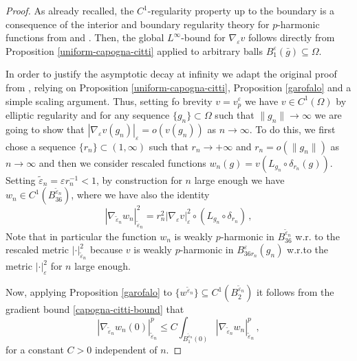 \documentclass[10pt]{amsart}
\numberwithin{equation}{section}
\theoremstyle{definition}
\begin{document}
\begin{proof}

As already recalled, the $C^1$-regularity property up to the boundary is a consequence of the interior and boundary regularity theory for $p$-harmonic functions from \cite{Dibenedetto} and \cite{Lieberman}. Then, the global $L^\infty$-bound for $\nabla_\varepsilon v$ follows directly from Proposition \ref{uniform-capogna-citti} applied to arbitrary balls $B_1^\varepsilon(\bar{g})\subseteq \Omega$. 

In order to justify the asymptotic decay at infinity we adapt the original proof from \cite{Moser}, relying on Proposition \ref{uniform-capogna-citti}, Proposition \ref{garofalo} and a simple scaling argument. Thus, setting fo brevity $v=v^\varepsilon_p$ we have $v \in C^1(\Omega)$ by elliptic regularity and for any sequence $\{g_n\} \subset \Omega$ such that $\|g_n\| \to \infty$ we are going to show that $|\nabla_\varepsilon v (g_n) |_\varepsilon =o(v(g_n))$ as $n \to \infty$. To do this, we first chose a sequence $\{r_n\} \subset (1,\infty)$ such that $r_n \to +\infty$ and $r_n=o(\|g_n\|)$ as $n \to \infty$ and then we consider rescaled functions 
$w_n(g)=v(L_{g_n}\circ \delta_{r_n}(g))$. 
Setting $\tilde{\varepsilon}_n=\varepsilon r_n^{-1}<1$, by construction for $n$ large enough we have $w_n\in  C^1 (B^{\tilde{\varepsilon}_n}_{36})$, where we have also the identity
\begin{equation}
\label{equivariance} 
|\nabla_{\tilde{\varepsilon}_n} w_n|^2_{\tilde{\varepsilon}_n}= r^2_n |\nabla_\varepsilon v|^2_\varepsilon \circ (L_{g_n} \circ\delta_{r_n})\, , \end{equation}
 Note that in particular the function $w_n$ is weakly $p$-harmonic in $B^{\tilde{\varepsilon}_n}_{36 }$ w.r. to the rescaled metric $|\cdot|^2_{\tilde{\varepsilon}_n}$ because $v$ is weakly $p$-harmonic in $B^\varepsilon_{ 36  r_n}(g_n)$ w.r.to the metric $|\cdot|^2_\varepsilon$ for $n$ large enough.   
 
Now, applying Proposition \ref{garofalo} to $\{w^{\tilde{\varepsilon}_n}\} \subseteq  C^1(B_2^{\tilde{\varepsilon}_n})$ it follows from the gradient bound \eqref{capogna-citti-bound}  that
\begin{equation}
	\label{claim2wn}
	|\nabla_{\tilde{\varepsilon}_n} w_n (0)|^p_{\tilde{\varepsilon}_n} \leq C    \int_{ B_{1}^{\tilde{\varepsilon}_n}(0)} |\nabla_{\tilde{\varepsilon}_n} w_n|_{\tilde{\varepsilon}_n}^p \, ,
\end{equation} 
for a constant $C>0$ independent of $n$. 


\end{proof}
\end{document}
